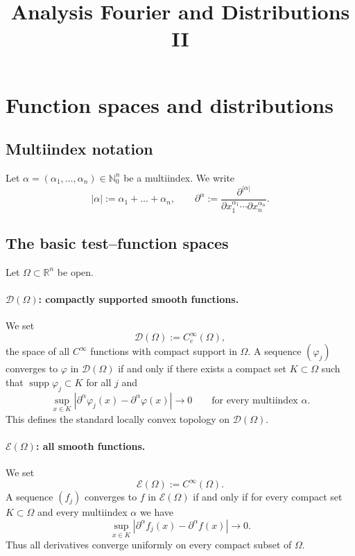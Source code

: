 \documentclass[12pt,a4paper]{article}
\title{\Large Analysis Fourier and Distributions II}
\author{}
\date{}
\theoremstyle{plain}
\theoremstyle{definition}
\theoremstyle{remark}
\theoremstyle{remark}
\begin{document}
	
	\maketitle


\section*{Function spaces and distributions}

\subsection*{Multiindex notation}
Let $\alpha=(\alpha_1,\dots,\alpha_n)\in\mathbb{N}_0^n$ be a multiindex.
We write
\[
|\alpha| := \alpha_1+\dots+\alpha_n,
\qquad
\partial^\alpha
:= \frac{\partial^{|\alpha|}}{\partial x_1^{\alpha_1}\cdots \partial x_n^{\alpha_n}}.
\]

\subsection*{The basic test--function spaces}

Let $\Omega\subset\mathbb{R}^n$ be open.

\paragraph{$\mathcal{D}(\Omega)$: compactly supported smooth functions.}
We set
\[
\mathcal{D}(\Omega) := C_c^\infty(\Omega),
\]
the space of all $C^\infty$ functions with compact support in $\Omega$.
A sequence $(\varphi_j)$ converges to $\varphi$ in $\mathcal{D}(\Omega)$ if and
only if there exists a compact set $K\subset\Omega$ such that
$\operatorname{supp}\varphi_j\subset K$ for all $j$ and
\[
\sup_{x\in K}|\partial^\alpha\varphi_j(x)-\partial^\alpha\varphi(x)|
\longrightarrow 0
\qquad\text{for every multiindex }\alpha.
\]
This defines the standard locally convex topology on $\mathcal{D}(\Omega)$.

\paragraph{$\mathcal{E}(\Omega)$: all smooth functions.}
We set
\[
\mathcal{E}(\Omega) := C^\infty(\Omega).
\]
A sequence $(f_j)$ converges to $f$ in $\mathcal{E}(\Omega)$ if and only if
for every compact set $K\subset\Omega$ and every multiindex $\alpha$ we have
\[
\sup_{x\in K}|\partial^\alpha f_j(x)-\partial^\alpha f(x)|
\longrightarrow 0.
\]
Thus all derivatives converge uniformly on every compact subset of $\Omega$.
\end{document}

